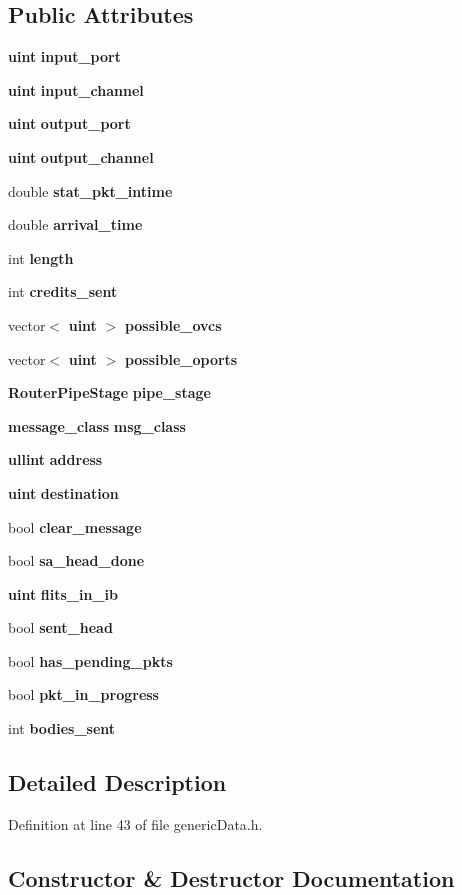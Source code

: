 \subsection*{Public Attributes}
\begin{CompactItemize}
\item 
{\bf uint} {\bf input\_\-port}
\item 
{\bf uint} {\bf input\_\-channel}
\item 
{\bf uint} {\bf output\_\-port}
\item 
{\bf uint} {\bf output\_\-channel}
\item 
double {\bf stat\_\-pkt\_\-intime}
\item 
double {\bf arrival\_\-time}
\item 
int {\bf length}
\item 
int {\bf credits\_\-sent}
\item 
vector$<$ {\bf uint} $>$ {\bf possible\_\-ovcs}
\item 
vector$<$ {\bf uint} $>$ {\bf possible\_\-oports}
\item 
{\bf RouterPipeStage} {\bf pipe\_\-stage}
\item 
{\bf message\_\-class} {\bf msg\_\-class}
\item 
{\bf ullint} {\bf address}
\item 
{\bf uint} {\bf destination}
\item 
bool {\bf clear\_\-message}
\item 
bool {\bf sa\_\-head\_\-done}
\item 
{\bf uint} {\bf flits\_\-in\_\-ib}
\item 
bool {\bf sent\_\-head}
\item 
bool {\bf has\_\-pending\_\-pkts}
\item 
bool {\bf pkt\_\-in\_\-progress}
\item 
int {\bf bodies\_\-sent}
\end{CompactItemize}


\subsection{Detailed Description}


Definition at line 43 of file genericData.h.

\subsection{Constructor \& Destructor Documentation}
